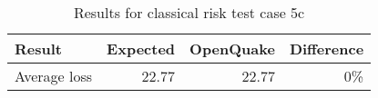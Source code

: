 \begin{table}[htbp]

\centering
\begin{tabular}{ l r r r }

\hline
\rowcolor{anti-flashwhite}
\bf{Result} & \bf{Expected} & \bf{OpenQuake} & \bf{Difference}\\
\hline
Average loss & 22.77 & 22.77 & 0\% \\
\hline
\end{tabular}

\caption{Results for classical risk test case 5c}
\label{tab:result-classical-risk-5c}
\end{table}